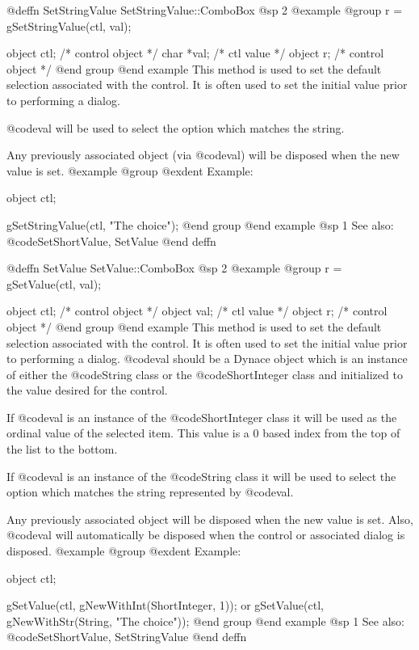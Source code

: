 @deffn {SetStringValue} SetStringValue::ComboBox
@sp 2
@example
@group
r = gSetStringValue(ctl, val);

object  ctl;    /*  control object  */
char    *val;   /*  ctl value       */
object  r;      /*  control object  */
@end group
@end example
This method is used to set the default selection associated with the
control.  It is often used to set the initial value prior to performing
a dialog.  

@code{val} will be used to select the option which matches the string.

Any previously associated object (via @code{val}) will be disposed when
the new value is set.  
@example
@group
@exdent Example:

object  ctl;

gSetStringValue(ctl, "The choice");
@end group
@end example
@sp 1
See also:  @code{SetShortValue, SetValue}
@end deffn










@deffn {SetValue} SetValue::ComboBox
@sp 2
@example
@group
r = gSetValue(ctl, val);

object  ctl;    /*  control object  */
object  val;    /*  ctl value       */
object  r;      /*  control object  */
@end group
@end example
This method is used to set the default selection associated with the
control.  It is often used to set the initial value prior to performing
a dialog.  @code{val} should be a Dynace object which is an instance of
either the @code{String} class or the @code{ShortInteger} class and
initialized to the value desired for the control.

If @code{val} is an instance of the @code{ShortInteger} class it will be
used as the ordinal value of the selected item.  This value is a 0 based
index from the top of the list to the bottom.

If @code{val} is an instance of the @code{String} class it will be used
to select the option which matches the string represented by @code{val}.

Any previously associated object will be disposed when the new value is set.
Also, @code{val} will automatically be disposed when the control or associated
dialog is disposed.
@example
@group
@exdent Example:

object  ctl;

gSetValue(ctl, gNewWithInt(ShortInteger, 1));
        or
gSetValue(ctl, gNewWithStr(String, "The choice"));
@end group
@end example
@sp 1
See also:  @code{SetShortValue, SetStringValue}
@end deffn













